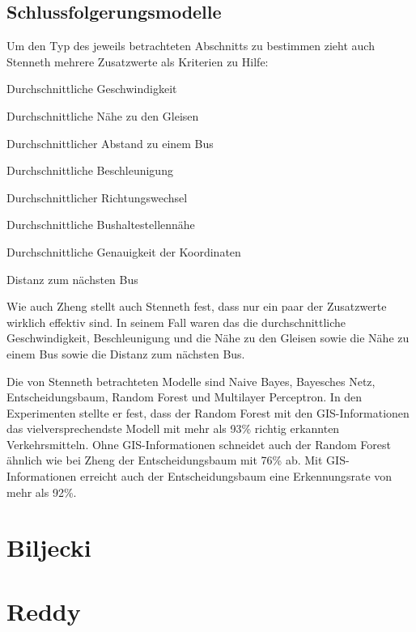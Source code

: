 \subsection{Schlussfolgerungsmodelle}
Um den Typ des jeweils betrachteten Abschnitts zu bestimmen zieht auch Stenneth mehrere Zusatzwerte als Kriterien zu Hilfe:
\begin{pitemize}
\item Durchschnittliche Geschwindigkeit
\item Durchschnittliche Nähe zu den Gleisen
\item Durchschnittlicher Abstand zu einem Bus
\item Durchschnittliche Beschleunigung
\item Durchschnittlicher Richtungswechsel
\item Durchschnittliche Bushaltestellennähe
\item Durchschnittliche Genauigkeit der Koordinaten
\item Distanz zum nächsten Bus
\end{pitemize}

Wie auch Zheng stellt auch Stenneth fest, dass nur ein paar der Zusatzwerte wirklich effektiv sind. In seinem Fall waren das die durchschnittliche Geschwindigkeit, Beschleunigung und die Nähe zu den Gleisen sowie die Nähe zu einem Bus sowie die Distanz zum nächsten Bus.

Die von Stenneth betrachteten Modelle sind Naive Bayes, Bayesches Netz, Entscheidungsbaum, Random Forest und Multilayer Perceptron. In den Experimenten stellte er fest, dass der Random Forest mit den GIS-Informationen das vielversprechendste Modell mit mehr als 93\% richtig erkannten Verkehrsmitteln. Ohne GIS-Informationen schneidet auch der Random Forest ähnlich wie bei Zheng der Entscheidungsbaum mit 76\% ab. Mit GIS-Informationen erreicht auch der Entscheidungsbaum eine Erkennungsrate von mehr als 92\%. 

\section{Biljecki}



\section{Reddy}

\cite{reddy_using_2010, stenneth_transportation_2011, zheng_understanding_2010}


